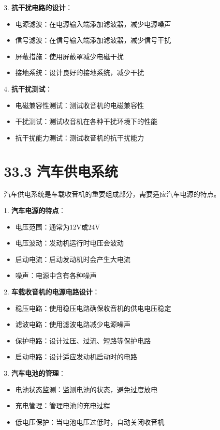 \documentclass[12pt,UTF8]{ctexbook}
\begin{document}
3. \textbf{抗干扰电路的设计}：
   \begin{itemize}[leftmargin=3.5em]
   \item 电源滤波：在电源输入端添加滤波器，减少电源噪声
   \item 信号滤波：在信号输入端添加滤波器，减少信号干扰
   \item 屏蔽措施：使用屏蔽罩减少电磁干扰
   \item 接地系统：设计良好的接地系统，减少干扰
   \end{itemize}

4. \textbf{抗干扰测试}：
   \begin{itemize}[leftmargin=3.5em]
   \item 电磁兼容性测试：测试收音机的电磁兼容性
   \item 干扰测试：测试收音机在各种干扰环境下的性能
   \item 抗干扰能力测试：测试收音机的抗干扰能力
   \end{itemize}

\section*{33.3 汽车供电系统}

汽车供电系统是车载收音机的重要组成部分，需要适应汽车电源的特点。

1. \textbf{汽车电源的特点}：
   \begin{itemize}[leftmargin=3.5em]
   \item 电压范围：通常为12V或24V
   \item 电压波动：发动机运行时电压会波动
   \item 启动电流：启动发动机时会产生大电流
   \item 噪声：电源中含有各种噪声
   \end{itemize}

2. \textbf{车载收音机的电源电路设计}：
   \begin{itemize}[leftmargin=3.5em]
   \item 稳压电路：使用稳压电路确保收音机的供电电压稳定
   \item 滤波电路：使用滤波电路减少电源噪声
   \item 保护电路：设计过压、过流、短路等保护电路
   \item 启动电路：设计适应发动机启动时的电路
   \end{itemize}

3. \textbf{汽车电池的管理}：
   \begin{itemize}[leftmargin=3.5em]
   \item 电池状态监测：监测电池的状态，避免过度放电
   \item 充电管理：管理电池的充电过程
   \item 低电压保护：当电池电压过低时，自动关闭收音机
   \end{itemize}
\end{document}
